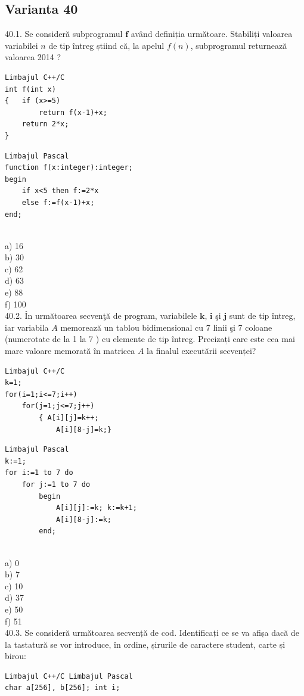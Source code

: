 \begin{itemize}
\begin{enumerate}
\section*{Varianta 40}

40.1. Se consideră subprogramul $\mathbf{f}$ având definiția următoare. Stabiliți valoarea variabilei $n$ de tip întreg știind că, la apelul $f(n)$, subprogramul returnează valoarea 2014 ?
\begin{verbatim}
Limbajul C++/C
int f(int x)
{   if (x>=5)
        return f(x-1)+x;
    return 2*x;
}
\end{verbatim}
\begin{verbatim}
Limbajul Pascal
function f(x:integer):integer;
begin
    if x<5 then f:=2*x
    else f:=f(x-1)+x;
end;
\end{verbatim}
\\
a) 16
\\
b) 30
\\
c) 62
\\
d) 63
\\
e) 88
\\
f) 100
\\
40.2. În următoarea secvenţă de program, variabilele $\mathbf{k}$, $\mathbf{i}$ şi $\mathbf{j}$ sunt de tip întreg, iar variabila $A$ memorează un tablou bidimensional cu 7 linii şi 7 coloane (numerotate de la 1 la 7 ) cu elemente de tip întreg. Precizați care este cea mai mare valoare memorată în matricea $A$ la finalul executării secvenței?
\begin{verbatim}
Limbajul C++/C
k=1;
for(i=1;i<=7;i++)
    for(j=1;j<=7;j++)
        { A[i][j]=k++;
            A[i][8-j]=k;}
\end{verbatim}
\begin{verbatim}
Limbajul Pascal
k:=1;
for i:=1 to 7 do
    for j:=1 to 7 do
        begin
            A[i][j]:=k; k:=k+1;
            A[i][8-j]:=k;
        end;
\end{verbatim}
\\
a) 0
\\
b) 7
\\
c) 10
\\
d) 37
\\
e) 50
\\
f) 51
\\
40.3. Se consideră următoarea secvență de cod. Identificați ce se va afișa dacă de la tastatură se vor introduce, în ordine, șirurile de caractere student, carte și birou:
\begin{verbatim}
Limbajul C++/C Limbajul Pascal
char a[256], b[256]; int i;

\end{verbatim}
\end{enumerate}
\end{itemize}

